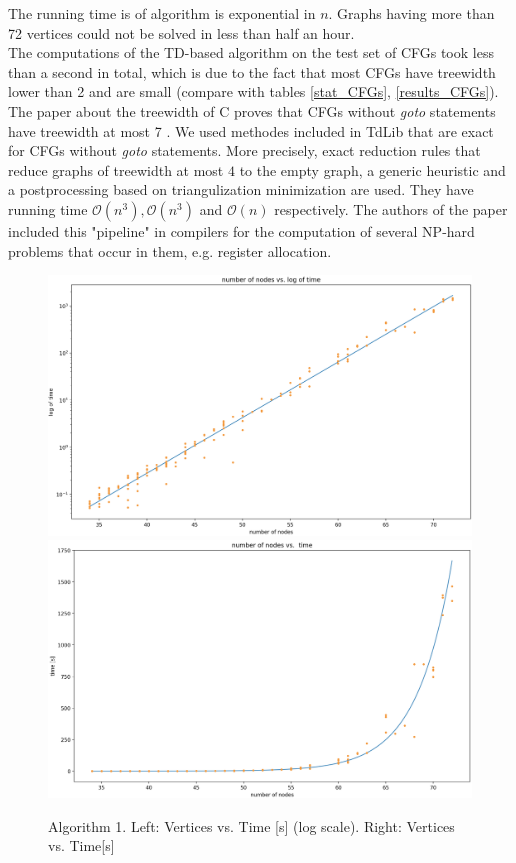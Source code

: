\documentclass[11pt,a4paper]{article}
\begin{document}
\vspace*{-7mm}

The running time is of algorithm is exponential in $n$. Graphs having more than 72 vertices could not be solved in less than half an hour. \\

The computations of the TD-based algorithm on the test set of CFGs took less than a second in total, which is due to the fact that most CFGs have treewidth lower than 2 and are small (compare with tables \ref{stat_CFGs}, \ref{results_CFGs}). The paper about the treewidth of C proves that CFGs without \emph{goto} statements have treewidth at most 7 \cite{Ctree}. We used methodes included in TdLib that are exact for CFGs without \emph{goto} statements. More precisely, exact reduction rules that reduce graphs of treewidth at most $4$ to the empty graph, a generic heuristic and a postprocessing based on triangulization minimization are used. They have running time $\mathcal{O}(n^{3}), \mathcal{O}(n^{3})$ and $\mathcal{O}(n)$ respectively. The authors of the paper included this "pipeline" in compilers for the computation of several NP-hard problems that occur in them, e.g. register allocation.  

\begin{center}
\begin{figure}
\centering
  \includegraphics[width=0.4\linewidth]{log.png}
  \includegraphics[width=0.4\linewidth]{exp.png}
  \caption{Algorithm 1. Left: Vertices vs. Time [s] (log scale). Right: Vertices vs. Time[s]}
\end{figure}
\end{center}
\end{document}
